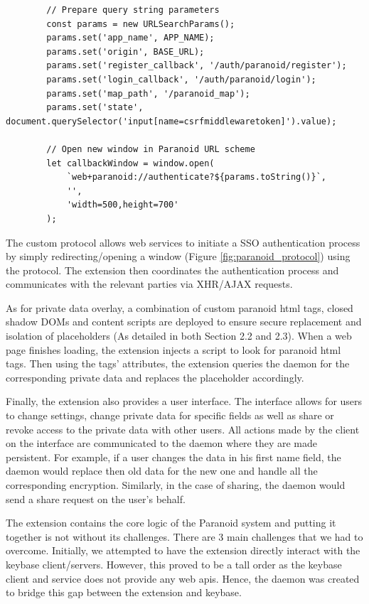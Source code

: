 \documentclass[letterpaper,twocolumn,10pt]{article}
\begin{document}
\begin{center}
    \begin{lstlisting}
        // Prepare query string parameters
        const params = new URLSearchParams();
        params.set('app_name', APP_NAME);
        params.set('origin', BASE_URL);
        params.set('register_callback', '/auth/paranoid/register');
        params.set('login_callback', '/auth/paranoid/login');
        params.set('map_path', '/paranoid_map');
        params.set('state', document.querySelector('input[name=csrfmiddlewaretoken]').value);

        // Open new window in Paranoid URL scheme
        let callbackWindow = window.open(
            `web+paranoid://authenticate?${params.toString()}`,
            '',
            'width=500,height=700'
        );
    \end{lstlisting}
    \label{fig:paranoid_protocol}
\end{center}

The custom protocol allows web services to initiate a SSO authentication process by simply redirecting/opening a window (Figure \ref{fig:paranoid_protocol}) using the protocol. The extension then coordinates the authentication process and communicates with the relevant parties via XHR/AJAX requests. 

As for private data overlay, a combination of custom paranoid html tags, closed shadow DOMs and content scripts are deployed to ensure secure replacement and isolation of placeholders (As detailed in both Section 2.2 and 2.3). When a web page finishes loading, the extension injects a script to look for paranoid html tags. Then using the tags' attributes, the extension queries the daemon for the corresponding private data and replaces the placeholder accordingly.

Finally, the extension also provides a user interface. The interface allows for users to change settings, change private data for specific fields as well as share or revoke access to the private data with other users. All actions made by the client on the interface are communicated to the daemon where they are made persistent. For example, if a user changes the data in his first name field, the daemon would replace then old data for the new one and handle all the corresponding encryption. Similarly, in the case of sharing, the daemon would send a share request on the user's behalf.

The extension contains the core logic of the Paranoid system and putting it together is not without its challenges. There are 3 main challenges that we had to overcome. Initially, we attempted to have the extension directly interact with the keybase client/servers. However, this proved to be a tall order as the keybase client and service does not provide any web apis. Hence, the daemon was created to bridge this gap between the extension and keybase. 
\end{document}
